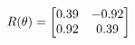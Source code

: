 \documentclass[preview]{standalone}
\begin{document}
\begin{align*}
\special{dvisvgm:raw <g id='unique000'>}R(\theta) = \begin{bmatrix}0.39 & -0.92\\0.92 & 0.39\end{bmatrix}\special{dvisvgm:raw </g>}
\end{align*}
\end{document}
